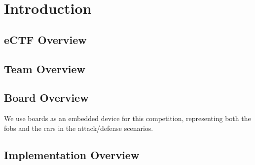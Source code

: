 \section{Introduction}
\label{sec:intro}

\subsection{eCTF Overview}

\subsection{Team Overview}

\subsection{Board Overview}

We use  boards as an embedded device for this competition, representing both the fobs and the cars in the attack/defense scenarios.



\subsection{Implementation Overview}
